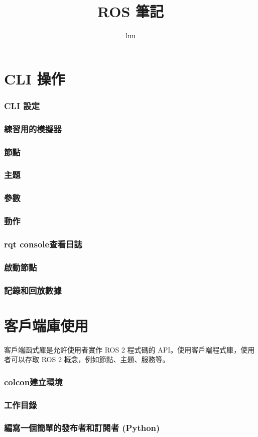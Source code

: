 \documentclass{article}
\title{ROS 筆記}
\author{luu}
\date{} %
\begin{document}
\maketitle
\tableofcontents

\part{CLI 操作}
\section{CLI 設定}

\section{練習用的模擬器}

\section{節點}

\section{主題}

\section{參數}

\section{動作}

\section{rqt console查看日誌}

\section{啟動節點}

\section{記錄和回放數據}


\part{客戶端庫使用}
客戶端函式庫是允許使用者實作 ROS 2 程式碼的 API。使用客戶端程式庫，使用者可以存取 ROS 2 概念，例如節點、主題、服務等。
\section{colcon建立環境}

\section{工作目錄}

\section{編寫一個簡單的發布者和訂閱者 (Python)}

\end{document}
